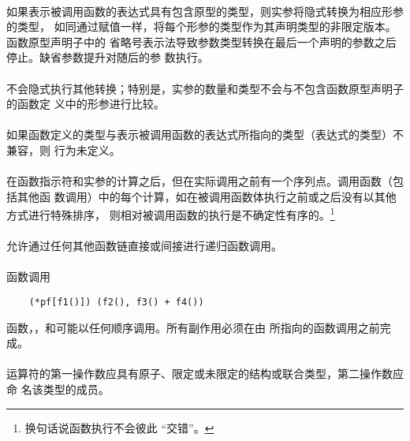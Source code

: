 \paragraph{}
如果表示被调用函数的表达式具有包含原型的类型，则实参将隐式转换为相应形参的类型，
如同通过赋值一样，将每个形参的类型作为其声明类型的非限定版本。函数原型声明子中的
省略号表示法导致参数类型转换在最后一个声明的参数之后停止。缺省参数提升对随后的参
数执行。

\paragraph{}
不会隐式执行其他转换；特别是，实参的数量和类型不会与不包含函数原型声明子的函数定
义中的形参进行比较。

\paragraph{}
如果函数定义的类型与表示被调用函数的表达式所指向的类型（表达式的类型）不兼容，则
行为未定义。

\paragraph{}
在函数指示符和实参的计算之后，但在实际调用之前有一个序列点。调用函数（包括其他函
数调用）中的每个计算，如在被调用函数体执行之前或之后没有以其他方式进行特殊排序，
则相对被调用函数的执行是不确定性有序的。\footnote{换句话说函数执行不会彼此
``交错''。}

\paragraph{}
允许通过任何其他函数链直接或间接进行递归函数调用。

\paragraph{}
\ex* 函数调用
\begin{lstlisting}
    (*pf[f1()]) (f2(), f3() + f4())
\end{lstlisting}
函数，，和可能以任何顺序调用。所有副作用必须在由
所指向的函数调用之前完成。


\constraint
\paragraph{}
运算符的第一操作数应具有原子、限定或未限定的结构或联合类型，第二操作数应命
名该类型的成员。

